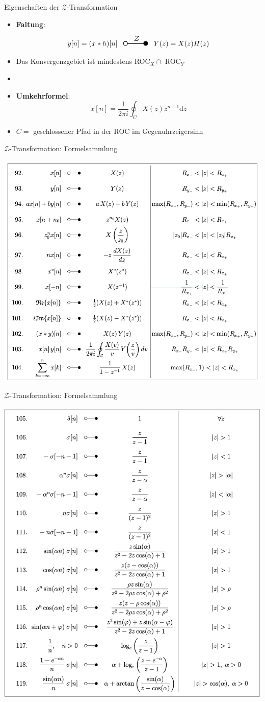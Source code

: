 \documentclass[14pt, aspectratio=169, handout]{beamer}
\newcommand{\transform}[2]{%
    \begin{tikzpicture}
        \draw[thick] (0,0) circle (0.1);
        \draw[thick] (0.1,0) -- (#2,0) node[midway, above] {#1};
        \filldraw[thick] (#2,0) circle (0.1);
    \end{tikzpicture}%
}
\begin{document}
\begin{frame}{Eigenschaften der $\mathcal{Z}$-Transformation}
    \begin{itemize}
    \item \textbf{Faltung}:
        $$y[n] = (x \ast h)[n] \hspace{8pt} \transform{$\mathcal{Z}$}{1} \hspace{8pt} Y(z) = X(z)H(z) $$
    \item[] Das Konvergenzgebiet ist mindestens ROC$_X \cap $ ROC$_Y$
    \item[] 
    \item \textbf{Umkehrformel}:
        $$x[n] = \frac{1}{2 \pi i} \oint_C X(z)z^{n-1} \text{d}z$$
    \item[] $C=$ geschlossener Pfad in der ROC im Gegenuhrzeigersinn
    \end{itemize}
\end{frame}

\begin{frame}{$\mathcal{Z}$-Transformation: Formelsammlung}
    \begin{center}
        \vspace*{-0.34cm}
        \includegraphics[width=0.63\linewidth]{figures/Z-Formelsammlung.png}
    \end{center}
\end{frame}

\begin{frame}{$\mathcal{Z}$-Transformation: Formelsammlung}
    \begin{center}
        \vspace*{-0.34cm}
        \includegraphics[width=0.48\linewidth]{figures/Z-Transformationspaare_pptx.png}
    \end{center}
\end{frame}
\end{document}
